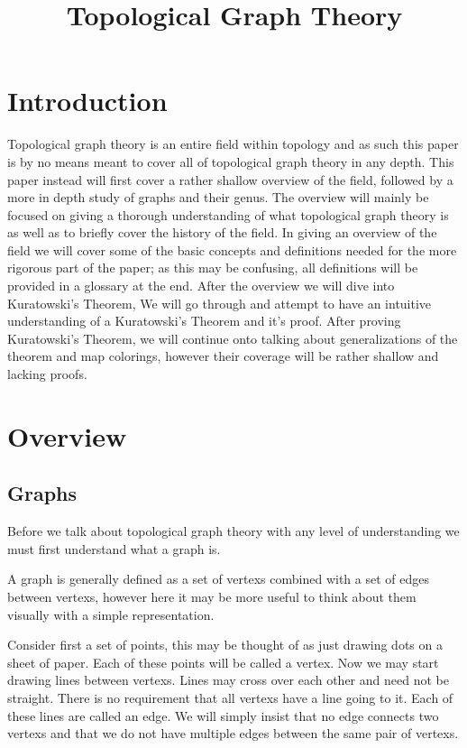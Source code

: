 \documentclass{article}
\title{Topological Graph Theory}
\begin{document}
\maketitle
\tableofcontents



\section{Introduction}
Topological graph theory is an entire field within topology and as such this paper is by no means meant to cover all of topological graph theory in any depth. This paper instead will first cover a rather shallow overview of the field, followed by a more in depth study of graphs and their genus. The overview will mainly be focused on giving a thorough understanding of what topological graph theory is as well as to briefly cover the history of the field. In giving an overview of the field we will cover some of the basic concepts and definitions needed for the more rigorous part of the paper; as this may be confusing, all definitions will be provided in a glossary at the end. After the overview we will dive into Kuratowski's Theorem, We will go through and attempt to have an intuitive understanding of a Kuratowski's Theorem and it's proof. After proving Kuratowski's Theorem, we will continue onto talking about generalizations of the theorem and map colorings, however their coverage will be rather shallow and lacking proofs.

\section{Overview}
\subsection{Graphs}
Before we talk about topological graph theory with any level of understanding we must first understand what a graph is.

A graph is generally defined as a \gls{set} of \glspl{vertex} combined with a \gls{set} of \glspl{edge} between \glspl{vertex}, however here it may be more useful to think about them visually with a simple representation.

Consider first a \gls{set} of points, this may be thought of as just drawing dots on a sheet of paper. Each of these points will be called a \gls{vertex}. Now we may start drawing lines between \glspl{vertex}. Lines may cross over each other and need not be straight. There is no requirement that all \glspl{vertex} have a line going to it. Each of these lines are called an \gls{edge}. We will simply insist that no \gls{edge} connects two \glspl{vertex} and that we do not have multiple \glspl{edge} between the same pair of \glspl{vertex}.
\end{document}
